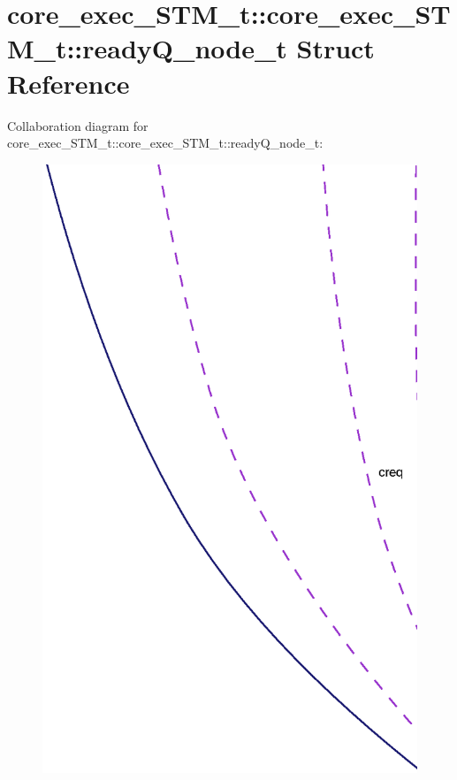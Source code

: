\section{core\_\-exec\_\-STM\_\-t::core\_\-exec\_\-STM\_\-t::readyQ\_\-node\_\-t Struct Reference}
\label{structcore__exec__STM__t_1_1readyQ__node__t}
Collaboration diagram for core\_\-exec\_\-STM\_\-t::core\_\-exec\_\-STM\_\-t::readyQ\_\-node\_\-t:\nopagebreak
\begin{figure}[H]
\begin{center}
\leavevmode
\includegraphics[width=400pt]{structcore__exec__STM__t_1_1readyQ__node__t__coll__graph}
\end{center}
\end{figure}
